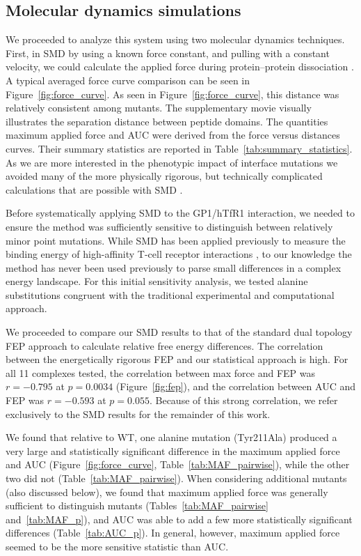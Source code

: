 \documentclass[12pt]{article}
\begin{document}
\subsection{Molecular dynamics simulations}

We proceeded to analyze this system using two molecular dynamics techniques. First, in SMD by using a known force constant, and pulling with a constant velocity, we could calculate the applied force during protein--protein dissociation \citep{Cuendet2008,Cuendet2011}. A typical averaged force curve comparison can be seen in Figure~\ref{fig:force_curve}. As seen in Figure~\ref{fig:force_curve}, this distance was relatively consistent among mutants. The supplementary movie visually illustrates the separation distance between peptide domains. The quantities maximum applied force and AUC were derived from the force versus distances curves. Their summary statistics are reported in Table~\ref{tab:summary_statistics}. As we are more interested in the phenotypic impact of interface mutations we avoided many of the more physically rigorous, but technically complicated calculations that are possible with SMD \citep{Is2001A,Is2001B}.

Before systematically applying SMD to the GP1/hTfR1 interaction, we needed to ensure the method was sufficiently sensitive to distinguish between relatively minor point mutations. While SMD has been applied previously to measure the binding energy of high-affinity T-cell receptor interactions \citep{Cuendet2008,Cuendet2011}, to our knowledge the method has never been used previously to parse small differences in a complex energy landscape. For this initial sensitivity analysis, we tested alanine substitutions congruent with the traditional experimental and computational approach. 

We proceeded to compare our SMD results to that of the standard dual topology FEP approach to calculate relative free energy differences. The correlation between the energetically rigorous FEP and our statistical approach is high. For all 11 complexes tested, the correlation between max force and FEP was $r=-0.795$ at $p=0.0034$ (Figure~\ref{fig:fep}), and the correlation between AUC and FEP was $r=-0.593$ at $p=0.055$. Because of this strong correlation, we refer exclusively to the SMD results for the remainder of this work.

We found that relative to WT, one alanine mutation (Tyr211Ala) produced a very large and statistically significant difference in the maximum applied force and AUC (Figure~\ref{fig:force_curve}, Table~\ref{tab:MAF_pairwise}), while the other two did not (Table~\ref{tab:MAF_pairwise}). When considering additional mutants (also discussed below), we found that maximum applied force was generally sufficient to distinguish mutants (Tables~\ref{tab:MAF_pairwise} and~\ref{tab:MAF_p}), and AUC was able to add a few more statistically significant differences (Table~\ref{tab:AUC_p}). In general, however, maximum applied force seemed to be the more sensitive statistic than AUC.
\end{document}
